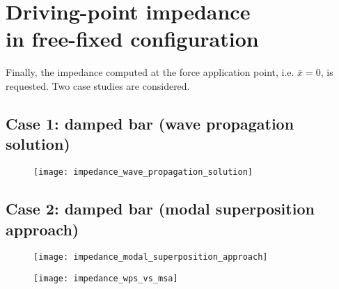 \documentclass[a4paper,12pt,oneside]{article}
\begin{document}
\vspace{150pt}

\begin{figure}[h]
	\centering
	\def\svgwidth{\columnwidth}
	
\end{figure}

\clearpage

\begin{figure}[h]
	\vspace{50pt}
	\centering
	\def\svgwidth{\columnwidth}
	
\end{figure}


\section{Driving-point impedance \\ in free-fixed configuration}

Finally, the impedance computed at the force application point, i.e. $ \bar{x} = 0 $, is requested. Two case studies are considered.

\subsection*{Case 1: damped bar (wave propagation solution)}



\begin{figure}[h]
	\hspace{-70pt}
	\texttt{[image: impedance\_wave\_propagation\_solution]}
\end{figure}

\subsection*{Case 2: damped bar (modal superposition approach)}

\begin{figure}[h]
	\hspace{-70pt}
	\texttt{[image: impedance\_modal\_superposition\_approach]}
\end{figure}

\begin{figure}[h]
	\hspace{-70pt}
	\texttt{[image: impedance\_wps\_vs\_msa]}
\end{figure}
\end{document}
